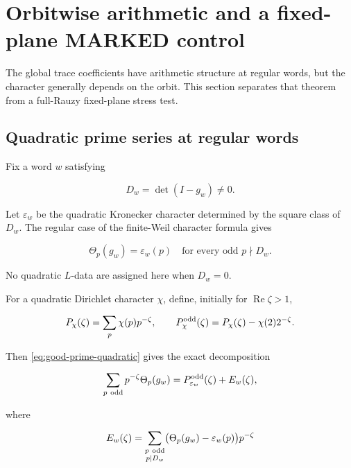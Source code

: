 \section{Orbitwise arithmetic and a fixed-plane MARKED control}
\label{sec:arithmetic}

The global trace coefficients have arithmetic structure at regular words,
but the character generally depends on the orbit.  This section separates
that theorem from a full-Rauzy fixed-plane stress test.

\subsection{Quadratic prime series at regular words}

Fix a word \(w\) satisfying

\begin{equation}
 D_w=\det(I-g_w)\ne0.
 \label{eq:D-nonzero}
\end{equation}

Let \(\varepsilon_w\) be the quadratic Kronecker character determined by the square
class of \(D_w\).  The regular case of the finite-Weil character formula
gives

\begin{equation}
 \Theta_p(g_w)=\varepsilon_w(p)
 \quad\text{for every odd }p\nmid D_w.
 \label{eq:good-prime-quadratic}
\end{equation}

No quadratic \(L\)-data are assigned here when \(D_w=0\).

For a quadratic Dirichlet character \(\chi\), define, initially for
\(\operatorname{Re}\zeta>1\),

\begin{equation}
 P_\chi(\zeta)=\sum_p\chi(p)p^{-\zeta},
 \qquad
 P_\chi^{\mathrm{odd}}(\zeta)
 =P_\chi(\zeta)-\chi(2)2^{-\zeta}.
 \label{eq:odd-prime-series}
\end{equation}

Then \cref{eq:good-prime-quadratic} gives the exact decomposition

\begin{equation}
 \sum_{p\ \mathrm{odd}}p^{-\zeta}\Theta_p(g_w)
 =P_{\varepsilon_w}^{\mathrm{odd}}(\zeta)+E_w(\zeta),
 \label{eq:word-prime-series}
\end{equation}

where

\begin{equation}
 E_w(\zeta)=
 \sum_{\substack{p\ \mathrm{odd}\\p\mid D_w}}
 \bigl(\Theta_p(g_w)-\varepsilon_w(p)\bigr)p^{-\zeta}
 \label{eq:finite-correction}
\end{equation}

